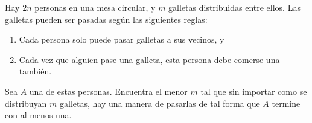 \begin{problem}
    Hay $2n$ personas en una mesa circular, y $m$ galletas distribuidas entre ellos. Las galletas pueden ser pasadas 
    seg\'un las siguientes reglas:
    \begin{enumerate}
        \item Cada persona solo puede pasar galletas a sus vecinos, y
        \item Cada vez que alguien pase una galleta, esta persona debe comerse una tambi\'en.
    \end{enumerate}
    Sea $A$ una de estas personas. Encuentra el menor $m$ tal que sin importar como se distribuyan $m$ galletas, hay una manera 
    de pasarlas de tal forma que $A$ termine con al menos una.
    \label{24EN485}
\end{problem}